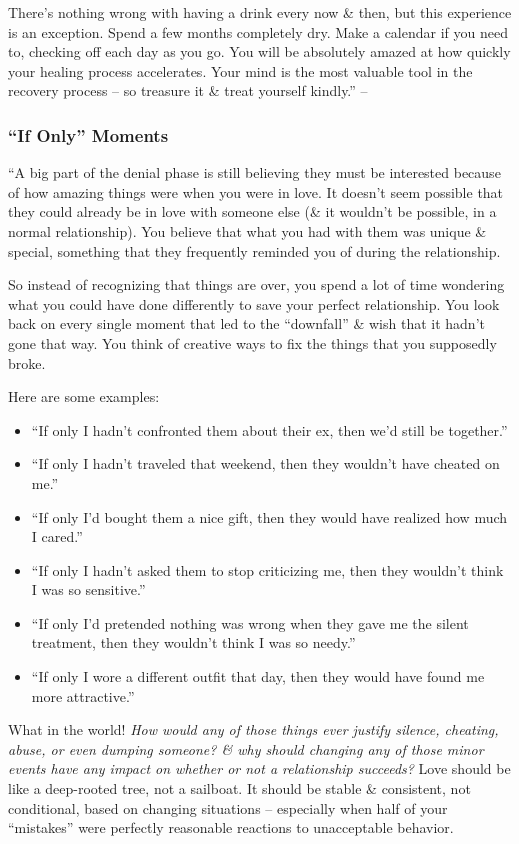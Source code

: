 \documentclass{article}
\numberwithin{equation}{section}
\begin{document}
There's nothing wrong with having a drink every now \& then, but this experience is an exception. Spend a few months completely dry. Make a calendar if you need to, checking off each day as you go. You will be absolutely amazed at how quickly your healing process accelerates. Your mind is the most valuable tool in the recovery process -- so treasure it \& treat yourself kindly.'' -- \cite[p. 96]{MacKenzie2015}

\subsubsection{``If Only'' Moments}
``A big part of the denial phase is still believing they must be interested because of how amazing things were when you were in love. It doesn't seem possible that they could already be in love with someone else (\& it wouldn't be possible, in a normal relationship). You believe that what you had with them was unique \& special, something that they frequently reminded you of during the relationship.

So instead of recognizing that things are over, you spend a lot of time wondering what you could have done differently to save your perfect relationship. You look back on every single moment that led to the ``downfall'' \& wish that it hadn't gone that way. You think of creative ways to fix the things that you supposedly broke.

Here are some examples:
\begin{itemize}
	\item ``If only I hadn't confronted them about their ex, then we'd still be together.''
	\item ``If only I hadn't traveled that weekend, then they wouldn't have cheated on me.''
	\item ``If only I'd bought them a nice gift, then they would have realized how much I cared.''
	\item ``If only I hadn't asked them to stop criticizing me, then they wouldn't think I was so sensitive.''
	\item ``If only I'd pretended nothing was wrong when they gave me the silent treatment, then they wouldn't think I was so needy.''
	\item ``If only I wore a different outfit that day, then they would have found me more attractive.''
\end{itemize}
What in the world! \textit{How would any of those things ever justify silence, cheating, abuse, or even dumping someone? \& why should changing any of those minor events have any impact on whether or not a relationship succeeds?} Love should be like a deep-rooted tree, not a sailboat. It should be stable \& consistent, not conditional, based on changing situations -- especially when half of your ``mistakes'' were perfectly reasonable reactions to unacceptable behavior.
\end{document}

